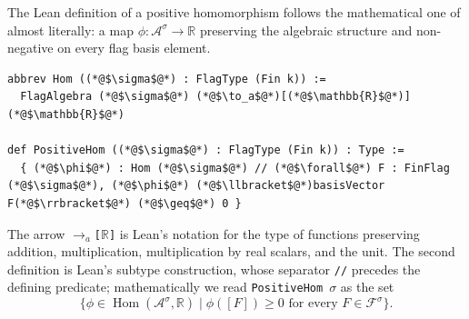 \documentclass[acmsmall,screen=true,acmthm=false]{acmart}
\DeclareRobustCommand{\lean}[1]{{\def\_{\textunderscore\allowbreak}\texttt{#1}}}
\begin{document}
The Lean definition of a positive homomorphism follows the mathematical one of
 almost literally: a map
\(\phi:\mathcal{A}^\sigma\to\mathbb{R}\) preserving the algebraic structure and
non-negative on every flag basis element.
\begin{lstlisting}
abbrev Hom ((*@$\sigma$@*) : FlagType (Fin k)) :=
  FlagAlgebra (*@$\sigma$@*) (*@$\to_a$@*)[(*@$\mathbb{R}$@*)] (*@$\mathbb{R}$@*)

def PositiveHom ((*@$\sigma$@*) : FlagType (Fin k)) : Type :=
  { (*@$\phi$@*) : Hom (*@$\sigma$@*) // (*@$\forall$@*) F : FinFlag (*@$\sigma$@*), (*@$\phi$@*) (*@$\llbracket$@*)basisVector F(*@$\rrbracket$@*) (*@$\geq$@*) 0 }
\end{lstlisting}
The arrow \lean{$\to_a$[$\mathbb{R}$]} is Lean's notation for the type of
functions preserving addition, multiplication, multiplication by real scalars,
and the unit.  The second definition is Lean's subtype construction, whose
separator \lean{//} precedes the defining predicate; mathematically we read
\lean{PositiveHom}~$\sigma$ as the set
\[
  \{\phi\in \operatorname{Hom}(\mathcal{A}^\sigma,\mathbb{R})
    \mid \phi([F])\ge 0
    \text{ for every }F\in\mathcal{F}^{\sigma}\}.
\]
\end{document}
